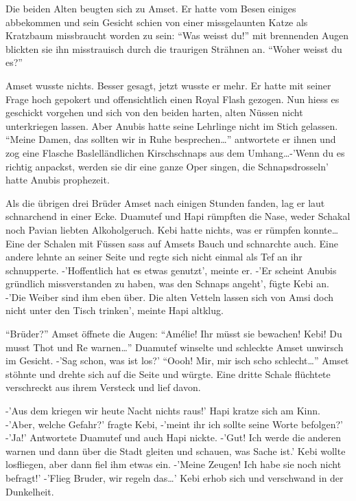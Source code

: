 \documentclass[11pt,titlepage,a5paper]{book}
\begin{document}
Die beiden Alten beugten sich zu Amset. Er hatte vom Besen einiges abbekommen und sein Gesicht schien von einer missgelaunten Katze als Kratzbaum missbraucht worden zu sein: "`Was weisst du!"' mit brennenden Augen blickten sie ihn misstrauisch durch die traurigen Strähnen an. "`Woher weisst du es?"'

Amset wusste nichts. Besser gesagt, jetzt wusste er mehr. Er hatte mit seiner Frage hoch gepokert und offensichtlich einen Royal Flash gezogen. Nun hiess es geschickt vorgehen und sich von den beiden harten, alten Nüssen nicht unterkriegen lassen. Aber Anubis hatte seine Lehrlinge nicht im Stich gelassen. "`Meine Damen, das sollten wir in Ruhe besprechen\dots "' antwortete er ihnen und zog eine Flasche Baslelländlichen Kirschschnaps aus dem Umhang\dots -'Wenn du es richtig anpackst, werden sie dir eine ganze Oper singen, die Schnapsdrosseln' hatte Anubis prophezeit.

Als die übrigen drei Brüder Amset nach einigen Stunden fanden, lag er laut schnarchend in einer Ecke. Duamutef und Hapi rümpften die Nase, weder Schakal noch Pavian liebten Alkoholgeruch. Kebi hatte nichts, was er rümpfen konnte\dots Eine der Schalen mit Füssen sass auf Amsets Bauch und schnarchte auch. Eine andere lehnte an seiner Seite und regte sich nicht einmal als Tef an ihr schnupperte. -'Hoffentlich hat es etwas genutzt', meinte er. -'Er scheint Anubis gründlich missverstanden zu haben, was den Schnaps angeht', fügte Kebi an. -'Die Weiber sind ihm eben über. Die alten Vetteln lassen sich von Amsi  doch nicht unter den Tisch trinken', meinte Hapi altklug.

"`Brüder?"' Amset öffnete die Augen: "`Amélie! Ihr müsst sie bewachen! Kebi! Du musst Thot und Re warnen\dots"' Duamutef winselte und schleckte Amset unwirsch im Gesicht. -'Sag schon, was ist los?' "`Oooh! Mir, mir isch scho schlecht\dots"' Amset stöhnte und drehte sich auf die Seite und würgte. Eine dritte Schale flüchtete verschreckt aus ihrem Versteck und lief davon.

-'Aus dem kriegen wir heute Nacht nichts raus!' Hapi kratze sich am Kinn. -'Aber, welche Gefahr?' fragte Kebi, -'meint ihr ich sollte seine Worte befolgen?' -'Ja!' Antwortete Duamutef und auch Hapi nickte. -'Gut! Ich werde die anderen warnen und dann über die Stadt gleiten und schauen, was Sache ist.' Kebi wollte losfliegen, aber dann fiel ihm etwas ein. -'Meine Zeugen! Ich habe sie noch nicht befragt!' -'Flieg Bruder, wir regeln das\dots' Kebi erhob sich und verschwand in der Dunkelheit.
\end{document}
